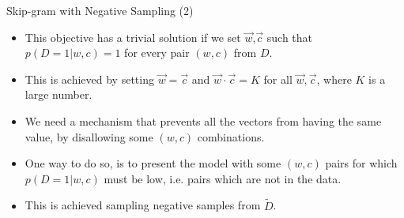 \documentclass[handout]{beamer}
\begin{document}
\begin{frame}{Skip-gram with Negative Sampling (2)}
\begin{scriptsize}
\begin{itemize}


\item This objective has a trivial solution if we set $\vec{w}$,$\vec{c}$ such that $p(D=1|w,c)=1$ for every pair $(w,c)$ from $D$.
\item This is achieved by setting $\vec{w}=\vec{c}$  and $\vec{w} \cdot \vec{c} = K$ for all $\vec{w},\vec{c}$, where $K$ is a large number.
\item We need a mechanism that prevents all the vectors from having the same value, by disallowing some $(w, c)$ combinations. 
\item One way to do so, is to present the model with some $(w, c)$ pairs for which $p(D= 1|w, c)$ must be low, i.e.
pairs which are not in the data.  
\item This is achieved sampling negative samples from $\tilde{D}$. 





\end{itemize}
\end{scriptsize}
\end{frame}
\end{document}

